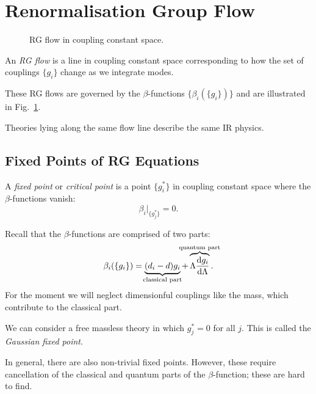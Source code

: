 
\section{Renormalisation Group Flow}%
\label{sec:renormalisation_group_flow}

\begin{figure}[tbhp]
  \centering
  \def\svgwidth{0.4\columnwidth}
  
  \caption{RG flow in coupling constant space.}
  \label{fig:l14f1}
\end{figure}

\begin{definition}[RG Flows]
  An \emph{RG flow} is a line in coupling constant space corresponding to how the set of couplings $\{g_i\}$ change as we integrate modes.
\end{definition}
These RG flows are governed by the $\beta$-functions $\{\beta_i(\{g_i\})\}$ and are illustrated in Fig.~\ref{fig:l14f1}.

Theories lying along the same flow line describe the same IR physics.

\subsection{Fixed Points of RG Equations}%
\label{sub:fixed_points_of_rg_equations}

\begin{definition}
  A \emph{fixed point} or \emph{critical point} is a point $\{g_i^*\}$ in coupling constant space where the $\beta$-functions vanish:
  \begin{equation}
    \beta_i\rvert_{\{g^*_j\}} = 0.
  \end{equation}
\end{definition}
Recall that the $\beta$-functions are comprised of two parts:
\begin{equation}
  \beta_i (\{g_i\}) = \underbrace{(d_i - d) g_i}_{\mathclap{\text{classical part}}} + \overbrace{\Lambda \dv{g_i}{\Lambda} (\{g_i\})}^{\mathclap{\text{quantum part}}}.
\end{equation}
For the moment we will neglect dimensionful couplings like the mass, which contribute to the classical part.

\begin{example}
  We can consider a free massless theory in which $g^*_j = 0$ for all $j$. This is called the \emph{Gaussian fixed point}.
\end{example}
In general, there are also non-trivial fixed points. However, these require cancellation of the classical and quantum parts of the $\beta$-function; these are hard to find.

